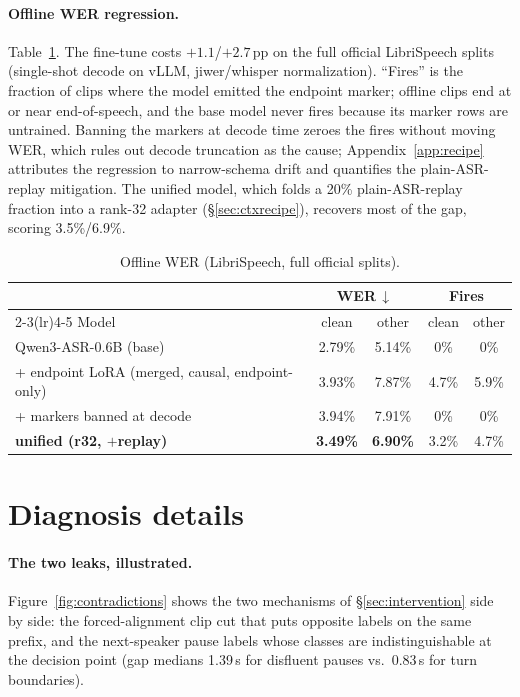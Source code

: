 \documentclass[11pt]{article}
\begin{document}
\paragraph{Offline WER regression.} Table~\ref{tab:wer}. The fine-tune costs $+1.1$/$+2.7$\,pp on the full official LibriSpeech splits (single-shot decode on vLLM, jiwer/whisper normalization). ``Fires'' is the fraction of clips where the model emitted the endpoint marker; offline clips end at or near end-of-speech, and the base model never fires because its marker rows are untrained. Banning the markers at decode time zeroes the fires without moving WER, which rules out decode truncation as the cause; Appendix~\ref{app:recipe} attributes the regression to narrow-schema drift and quantifies the plain-ASR-replay mitigation. The unified model, which folds a 20\% plain-ASR-replay fraction into a rank-32 adapter (\S\ref{sec:ctxrecipe}), recovers most of the gap, scoring 3.5\%/6.9\%.

\begin{table}[h]
  \centering\small
  \caption{Offline WER (LibriSpeech, full official splits).}
  \label{tab:wer}
  \begin{tabular}{lcccc}
    \toprule
    & \multicolumn{2}{c}{WER\,$\downarrow$} & \multicolumn{2}{c}{Fires} \\
    \cmidrule(lr){2-3}\cmidrule(lr){4-5}
    Model & clean & other & clean & other \\
    \midrule
    Qwen3-ASR-0.6B (base) & 2.79\% & 5.14\% & 0\% & 0\% \\
    + endpoint LoRA (merged, causal, endpoint-only) & 3.93\% & 7.87\% & 4.7\% & 5.9\% \\
    + markers banned at decode & 3.94\% & 7.91\% & 0\% & 0\% \\
    \textbf{unified (r32, $+$replay)} & \textbf{3.49\%} & \textbf{6.90\%} & 3.2\% & 4.7\% \\
    \bottomrule
  \end{tabular}
\end{table}

\section{Diagnosis details}
\label{app:markerprob}

\paragraph{The two leaks, illustrated.} Figure~\ref{fig:contradictions} shows the two mechanisms of \S\ref{sec:intervention} side by side: the forced-alignment clip cut that puts opposite labels on the same prefix, and the next-speaker pause labels whose classes are indistinguishable at the decision point (gap medians 1.39\,s for disfluent pauses vs.\ 0.83\,s for turn boundaries).
\end{document}
